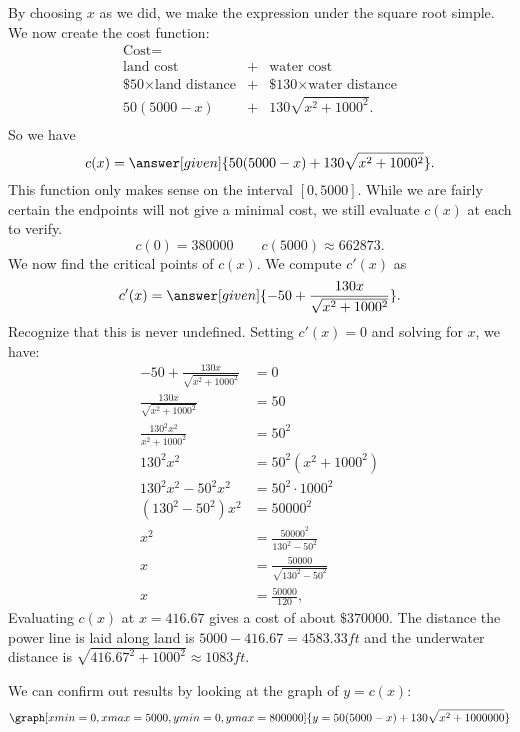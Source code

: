 \documentclass{ximera}
\begin{document}
\begin{example}
\begin{explanation}
\begin{image}
      \end{image}
      By choosing $x$ as we did, we make the expression under the
      square root simple. We now create the cost function:
    \[
    \begin{array}{ccc}
      \text{Cost} = & & \\
      \text{land cost} & + & \text{water cost} \\
      \text{\$50}\times \text{land distance} &+& \text{\$130}\times \text{water distance} \\
      50(5000-x) &+& 130\sqrt{x^2+1000^2}.\\
    \end{array}
    \]
    So we have
    \[
    c(x) = \answer[given]{50(5000-x)+ 130\sqrt{x^2+1000^2}}.
    \]
    This function only makes sense on the interval $[0,5000]$. While
    we are fairly certain the endpoints will not give a minimal cost,
    we still evaluate $c(x)$ at each to verify.
    \[
    c(0) = 380000 \quad\quad c(5000) \approx 662873.
    \]
    We now find the critical points of $c(x)$. We compute $c'(x)$ as
    \[
    c'(x) = \answer[given]{-50+\frac{130x}{\sqrt{x^2+1000^2}}}.
    \]
    Recognize that this is never undefined. Setting $c'(x)=0$ and solving
    for $x$, we have:
    \begin{align*}
      -50+\frac{130x}{\sqrt{x^2+1000^2}} &= 0 \\
      \frac{130x}{\sqrt{x^2+1000^2}}  &= 50\\
      \frac{130^2x^2}{x^2+1000^2} &= 50^2\\
      130^2x^2 &= 50^2(x^2+1000^2) \\
      130^2x^2-50^2x^2 &= 50^2\cdot1000^2\\
      (130^2-50^2)x^2 &= 50000^2\\
      x^2 &= \frac{50000^2}{130^2-50^2}\\
      x &= \frac{50000}{\sqrt{130^2-50^2}}\\
      x &= \frac{50000}{120},
    \end{align*}
    Evaluating $c(x)$ at $x=416.67$ gives a cost of about
    $\$370000$. The distance the power line is laid along land is
    $5000-416.67 = 4583.33\unit{ft}$ and the underwater distance is
    $\sqrt{416.67^2+1000^2} \approx 1083\unit{ft}$.
  \begin{onlineOnly}
  We can confirm out results by looking at the graph of $y=c(x)$: 
  \[
  \graph[xmin=0, xmax=5000, ymin=0, ymax=800000]{y=50(5000-x)+130\sqrt{x^2+1000000}}
  \]
  \end{onlineOnly}
  \end{explanation}
\end{example}
\end{document}

